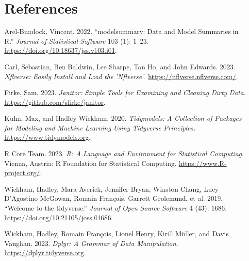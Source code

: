 \documentclass[
  letterpaper,
  DIV=11,
  numbers=noendperiod]{scrartcl}
\newlength{\cslhangindent}
\newenvironment{CSLReferences}[2] %
 {\begin{list}{}{%
  \setlength{\itemindent}{0pt}
  \setlength{\leftmargin}{0pt}
  \setlength{\parsep}{0pt}
  \ifodd #1
   \setlength{\leftmargin}{\cslhangindent}
   \setlength{\itemindent}{-1\cslhangindent}
  \fi
  \setlength{\itemsep}{#2\baselineskip}}}
 {\end{list}}
\begin{document}
\newpage

\section*{References}\label{references}

\label{refs}
\begin{CSLReferences}{1}{0}
Arel-Bundock, Vincent. 2022. {``{modelsummary}: Data and Model Summaries
in {R}.''} \emph{Journal of Statistical Software} 103 (1): 1--23.
\url{https://doi.org/10.18637/jss.v103.i01}.

Carl, Sebastian, Ben Baldwin, Lee Sharpe, Tan Ho, and John Edwards.
2023. \emph{Nflverse: Easily Install and Load the 'Nflverse'}.
\url{https://nflverse.nflverse.com/}.

Firke, Sam. 2023. \emph{Janitor: Simple Tools for Examining and Cleaning
Dirty Data}. \url{https://github.com/sfirke/janitor}.

Kuhn, Max, and Hadley Wickham. 2020. \emph{Tidymodels: A Collection of
Packages for Modeling and Machine Learning Using Tidyverse Principles.}
\url{https://www.tidymodels.org}.

R Core Team. 2023. \emph{R: A Language and Environment for Statistical
Computing}. Vienna, Austria: R Foundation for Statistical Computing.
\url{https://www.R-project.org/}.

Wickham, Hadley, Mara Averick, Jennifer Bryan, Winston Chang, Lucy
D'Agostino McGowan, Romain François, Garrett Grolemund, et al. 2019.
{``Welcome to the {tidyverse}.''} \emph{Journal of Open Source Software}
4 (43): 1686. \url{https://doi.org/10.21105/joss.01686}.

Wickham, Hadley, Romain François, Lionel Henry, Kirill Müller, and Davis
Vaughan. 2023. \emph{Dplyr: A Grammar of Data Manipulation}.
\url{https://dplyr.tidyverse.org}.

\end{CSLReferences}
\end{document}

